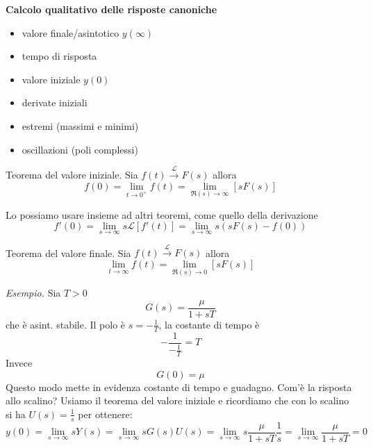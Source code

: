 \textbf{Calcolo qualitativo delle risposte canoniche}
\begin{itemize}
	\item valore finale/asintotico $y(\infty)$
	\item tempo di risposta
	\item valore iniziale $y(0)$
	\item derivate iniziali
	\item estremi (massimi e minimi)
	\item oscillazioni (poli complessi)
\end{itemize}
\begin{thm}{Teorema del valore iniziale.}{}
	Sia $f(t)\xrightarrow{\mathcal{L}} F(s)$ allora
	\begin{equation*}
		\boxed{f(0) =\lim _{t\to 0^{+}} f(t) =\lim _{\Re(s)\to \infty }[ sF(s)]}
	\end{equation*}
\end{thm}
Lo possiamo usare insieme ad altri teoremi, come quello della derivazione
\begin{equation*}
	f'(0) =\lim _{s\to \infty } s\mathcal{L}[ f'(t)] =\lim _{s\to \infty } s(sF(s) -f(0))
\end{equation*}
\begin{thm}{Teorema del valore finale.}{}
	Sia $f(t)\xrightarrow{\mathcal{L}} F(s)$ allora
	\begin{equation*}
		\boxed{\lim _{t\to \infty } f(t) =\lim _{\Re(s)\to 0}[ sF(s)]}
	\end{equation*}
\end{thm}
\textit{Esempio.} Sia $T >0$
\begin{equation*}
	G(s) =\frac{\mu }{1+sT}
\end{equation*}
che è asint. stabile. Il polo è $s=-\frac{1}{T}$, la costante di tempo è
\begin{equation*}
	-\frac{1}{-\frac{1}{T}} =T
\end{equation*}
Invece
\begin{equation*}
	G(0) =\mu 
\end{equation*}
Questo modo mette in evidenza costante di tempo e guadagno. Com'è la risposta allo scalino? Usiamo il teorema del valore iniziale e ricordiamo che con lo scalino si ha $U(s) =\frac{1}{s}$ per ottenere:
\begin{equation*}
	y(0) =\lim _{s\to \infty } sY(s) =\lim _{s\to \infty } sG(s) U(s) =\lim _{s\to \infty } s\frac{\mu }{1+sT}\frac{1}{s} =\lim _{s\to \infty }\frac{\mu }{1+sT} =0
\end{equation*}
